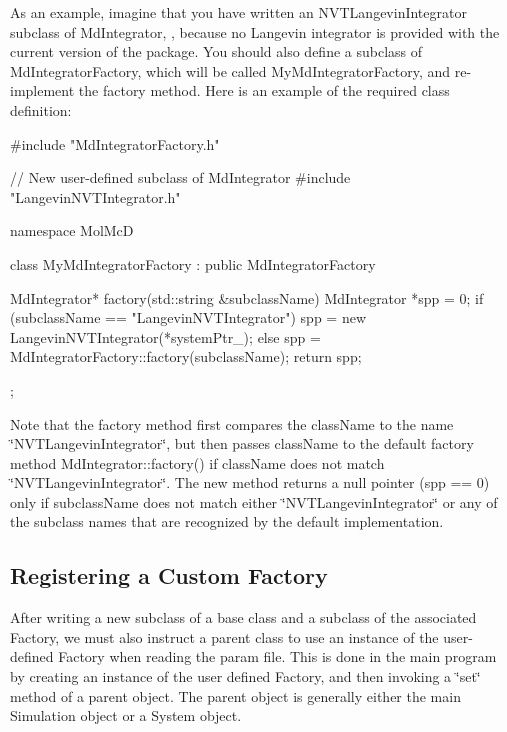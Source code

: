 \-As an example, imagine that you have written an \-N\-V\-T\-Langevin\-Integrator subclass of \-Md\-Integrator, , because no \-Langevin integrator is provided with the current version of the package. \-You should also define a subclass of \-Md\-Integrator\-Factory, which will be called \-My\-Md\-Integrator\-Factory, and re-\/implement the factory method. \-Here is an example of the required class definition\-: 
\begin{DoxyCode}
#include "MdIntegratorFactory.h"

// New user-defined subclass of MdIntegrator 
#include "LangevinNVTIntegrator.h"

namespace MolMcD 
{

   class MyMdIntegratorFactory : public MdIntegratorFactory 
   {

      MdIntegrator* factory(std::string &subclassName)
      {
         MdIntegrator *spp = 0;
         if (subclassName == "LangevinNVTIntegrator") {
            spp = new LangevinNVTIntegrator(*systemPtr_);
         } else {
            spp = MdIntegratorFactory::factory(subclassName);
         }
         return spp;
      }

   };

}
\end{DoxyCode}
 \-Note that the factory method first compares the class\-Name to the name \char`\"{}\-N\-V\-T\-Langevin\-Integrator\char`\"{}, but then passes class\-Name to the default factory method \-Md\-Integrator\-::factory() if class\-Name does not match \char`\"{}\-N\-V\-T\-Langevin\-Integrator\char`\"{}. \-The new method returns a null pointer (spp == 0) only if subclass\-Name does not match either \char`\"{}\-N\-V\-T\-Langevin\-Integrator\char`\"{} or any of the subclass names that are recognized by the default implementation.\hypertarget{extension_page_set_factory_extend_sec}{}\subsection{\-Registering a Custom Factory}\label{extension_page_set_factory_extend_sec}
\-After writing a new subclass of a base class and a subclass of the associated \-Factory, we must also instruct a parent class to use an instance of the user-\/defined \-Factory when reading the param file. \-This is done in the main program by creating an instance of the user defined \-Factory, and then invoking a \char`\"{}set\char`\"{} method of a parent object. \-The parent object is generally either the main \-Simulation object or a \-System object.

